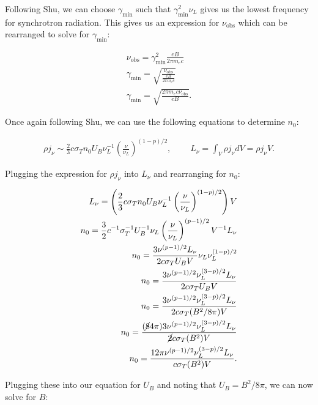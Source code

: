 \documentclass[12pt]{article}
\begin{document}
{\noindent}Following Shu, we can choose $\gamma_\mathrm{min}$ such that $\gamma_\mathrm{min}^2\nu_L$ gives us the lowest frequency for synchrotron radiation. This gives us an expression for $\nu_\mathrm{obs}$ which can be rearranged to solve for $\gamma_\mathrm{min}$:

\begin{align*}
    \nu_\mathrm{obs} = \gamma_\mathrm{min}^2 \frac{eB}{2\pi m_ec} \\
    \gamma_\mathrm{min} = \sqrt{\frac{\nu_\mathrm{obs}}{\frac{eB}{2\pi m_ec}}} \\
    \gamma_\mathrm{min} = \sqrt{{\frac{2\pi m_ec\nu_\mathrm{obs}}{eB}}}.
\end{align*}

{\noindent}Once again following Shu, we can use the following equations to determine $n_0$:

\begin{align*}
    \rho j_\nu \sim \frac{2}{3}c\sigma_Tn_0U_B\nu_L^{-1}\left(\frac{\nu}{\nu_L}\right)^{(1-p)/2}, ~~~~~~~~~~ L_\nu = \int_V \rho j_\nu dV = \rho j_\nu V.
\end{align*}

{\noindent}Plugging the expression for $\rho j_\nu$ into $L_\nu$ and rearranging for $n_0$:

\begin{align*}
    L_\nu = \left(\frac{2}{3}c\sigma_Tn_0U_B\nu_L^{-1}\left(\frac{\nu}{\nu_L}\right)^{(1-p)/2}\right) V \\
    n_0 = \frac{3}{2}c^{-1}\sigma_T^{-1}U_B^{-1}\nu_L\left(\frac{\nu}{\nu_L}\right)^{(p-1)/2} V^{-1} L_\nu \\
    n_0 = \frac{3\nu^{(p-1)/2}L_\nu}{2c\sigma_TU_BV} \nu_L \nu_L^{(1-p)/2} \\
    n_0 = \frac{3\nu^{(p-1)/2}\nu_L^{(3-p)/2}L_\nu}{2c\sigma_TU_BV} \\
    n_0 = \frac{3\nu^{(p-1)/2}\nu_L^{(3-p)/2}L_\nu}{2c\sigma_T(B^2/8\pi)V} \\
    n_0 = \frac{(\cancel{8}4\pi)3\nu^{(p-1)/2}\nu_L^{(3-p)/2}L_\nu}{\cancel{2}c\sigma_T(B^2)V} \\
    n_0 = \frac{12\pi\nu^{(p-1)/2}\nu_L^{(3-p)/2}L_\nu}{c\sigma_T(B^2)V}.
\end{align*}

{\noindent}Plugging these into our equation for $U_B$ and noting that $U_B = B^2/8\pi$, we can now solve for $B$:
\end{document}

